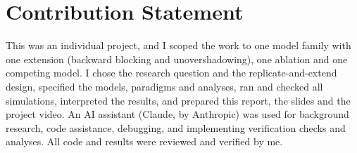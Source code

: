 \documentclass[conference,a4paper]{IEEEtran}
\begin{document}
\section*{Contribution Statement}
This was an individual project, and I scoped the work to one model family with
one extension (backward blocking and unovershadowing), one ablation and one
competing model. I chose the research question and the replicate-and-extend
design, specified the models, paradigms and analyses, ran and checked all
simulations, interpreted the results, and prepared this report, the slides and
the project video. An AI assistant (Claude, by Anthropic) was used for background
research, code assistance, debugging, and implementing verification checks and
analyses. All code and results were reviewed and verified by me.
\end{document}
